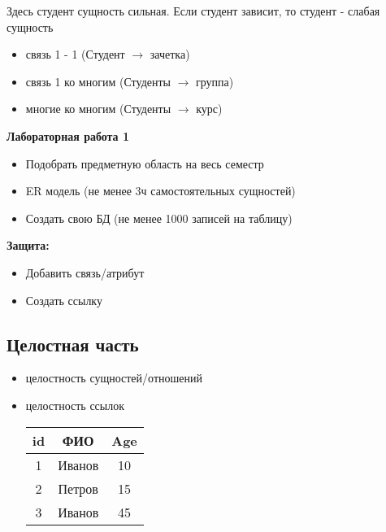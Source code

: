 \documentclass[a4paper, 14pt]{report}
\begin{document}
    Здесь студент сущность сильная. Если студент зависит, то студент - слабая сущность

    \begin{itemize}
        \item связь 1 - 1 (Студент $\to$ зачетка)
        \item связь 1 ко многим (Студенты $\to$ группа)
        \item многие ко многим (Студенты $\to$ курс)
    \end{itemize}

    \begin{lbox}{\textbf{Лабораторная работа 1}}
        \begin{itemize}
            \item Подобрать предметную область на весь семестр
            \item ER модель (не менее 3ч самостоятельных сущностей)
            \item Создать свою БД (не менее 1000 записей на таблицу)
        \end{itemize}
        \textbf{Защита:}
        \begin{itemize}
            \item Добавить связь/атрибут
            \item Создать ссылку
        \end{itemize}
    \end{lbox}

    \subsection{Целостная часть}

    \begin{itemize}
        \item целостность сущностей/отношений
        \item целостность ссылок

            \begin{tabular}{|c|c|c|}
                \hline
                id & ФИО & Age \\
                \hline
                1 & Иванов & 10 \\
                \hline
                2 & Петров & 15 \\
                \hline
                3 & Иванов & 45 \\
                \hline
            \end{tabular}
    \end{itemize}
\end{document}
